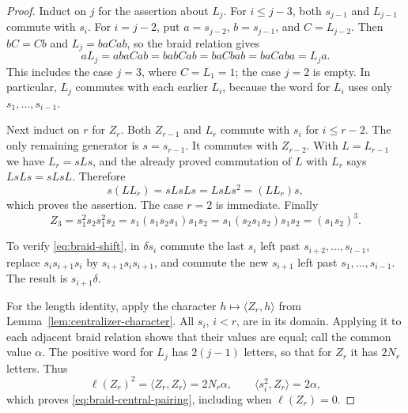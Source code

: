 \begin{proof}
Induct on $j$ for the assertion about $L_j$.  For $i\le j-3$, both
$s_{j-1}$ and $L_{j-1}$ commute with $s_i$.  For $i=j-2$, put
$a=s_{j-2}$, $b=s_{j-1}$, and $C=L_{j-2}$.  Then $bC=Cb$ and
$L_j=baCab$, so the braid relation gives
\[
 aL_j=abaCab=babCab=baCbab=baCaba=L_j a.
\]
This includes the case $j=3$, where $C=L_1=1$; the case $j=2$ is empty.
In particular, $L_j$ commutes with each earlier $L_i$, because the word
for $L_i$ uses only $s_1,\ldots,s_{i-1}$.

Next induct on $r$ for $Z_r$.  Both $Z_{r-1}$ and $L_r$ commute with
$s_i$ for $i\le r-2$.  The only remaining generator is $s=s_{r-1}$.
It commutes with $Z_{r-2}$.  With $L=L_{r-1}$ we have $L_r=sLs$,
and the already proved commutation of $L$ with $L_r$ says
$LsLs=sLsL$.  Therefore
\[
 s(LL_r)=sLsLs=LsLs^2=(LL_r)s,
\]
which proves the assertion.  The case $r=2$ is immediate.  Finally
\[
 Z_3=s_1^2s_2s_1^2s_2
     =s_1(s_1s_2s_1)s_1s_2
     =s_1(s_2s_1s_2)s_1s_2=(s_1s_2)^3.
\]

To verify \eqref{eq:braid-shift}, in $\delta s_i$ commute the last
$s_i$ left past $s_{i+2},\ldots,s_{l-1}$, replace
$s_i s_{i+1}s_i$ by $s_{i+1}s_i s_{i+1}$, and commute the new
$s_{i+1}$ left past $s_1,\ldots,s_{i-1}$.  The result is
$s_{i+1}\delta$.

For the length identity, apply the character
$h\mapsto\langle Z_r,h\rangle$ from
Lemma~\ref{lem:centralizer-character}.  All $s_i$, $i<r$, are in its
domain.  Applying it to each adjacent braid relation shows that their
values are equal; call the common value $\alpha$.  The positive word
for $L_j$ has $2(j-1)$ letters, so that for $Z_r$ it has $2N_r$ letters.
Thus
\[
 \ell(Z_r)^2=\langle Z_r,Z_r\rangle=2N_r\alpha,
 \qquad \langle s_i^2,Z_r\rangle=2\alpha,
\]
which proves \eqref{eq:braid-central-pairing}, including when
$\ell(Z_r)=0$.
\end{proof}


